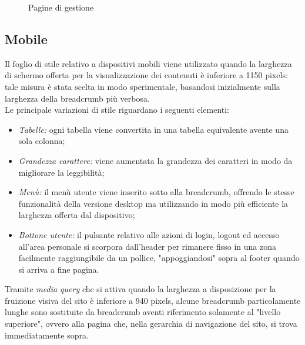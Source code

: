 \documentclass[]{article}
\begin{document}
\begin{figure}[H]
	\centering
	\caption{Pagine di gestione}
\end{figure}

\subsection{Mobile}
\label{presentazione:mobile}
Il foglio di stile relativo a dispositivi mobili viene utilizzato quando la larghezza di schermo offerta per la visualizzazione dei contenuti è inferiore a 1150 pixels: tale misura è stata scelta in modo sperimentale, basandosi inizialmente sulla larghezza della breadcrumb più verbosa.\\
Le principale variazioni di stile riguardano i seguenti elementi:
\begin{itemize}
	\item \textit{Tabelle:} ogni tabella viene convertita in una tabella equivalente avente una sola colonna;
	\item \textit{Grandezza carattere:} viene aumentata la grandezza dei caratteri in modo da migliorare la leggibilità;
	\item \textit{Menù:} il menù utente viene inserito sotto alla breadcrumb, offrendo le stesse funzionalità della versione desktop ma utilizzando in modo più efficiente la larghezza offerta dal dispositivo;
	\item \textit{Bottone utente:} il pulsante relativo alle azioni di login, logout ed accesso all'area personale si scorpora dall'header per rimanere fisso in una zona facilmente raggiungibile da un pollice, "appoggiandosi" sopra al footer quando si arriva a fine pagina.
\end{itemize}
Tramite \textit{media query} che si attiva quando la larghezza a disposizione per la fruizione visiva del sito è inferiore a 940 pixels, alcune breadcrumb particolamente lunghe sono sostituite da breadcrumb aventi riferimento solamente al "livello superiore", ovvero alla pagina che, nella gerarchia di navigazione del sito, si trova immediatamente sopra.
\end{document}
